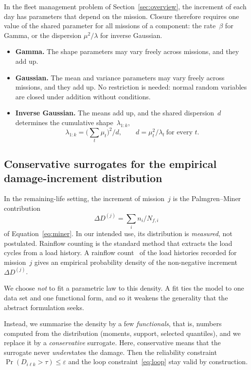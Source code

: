\documentclass[11pt,a4paper]{article}
\theoremstyle{plain}
\theoremstyle{definition}
\theoremstyle{remark}
\begin{document}
In the fleet management problem of Section~\ref{sec:overview}, the increment of each day has parameters that depend on the mission.
Closure therefore requires one value of the shared parameter for all missions of a component: the rate~$\beta$ for Gamma, or the dispersion $\mu^2/\lambda$ for inverse Gaussian.
\begin{itemize}
  \item \textbf{Gamma.} The shape parameters may vary freely across missions, and they add up.
  \item \textbf{Gaussian.} The mean and variance parameters may vary freely across missions, and they add up.
    No restriction is needed: normal random variables are closed under addition without conditions.
  \item \textbf{Inverse Gaussian.} The means add up, and the shared dispersion~$d$ determines the cumulative shape~$\lambda_{1:k}$,
    \begin{equation}
      \lambda_{1:k} = \Big(\sum_t \mu_t\Big)^2\Big/ d,
      \qquad
      d = \mu_t^2/\lambda_t \ \text{for every } t.
    \end{equation}
\end{itemize}

\subsection{Conservative surrogates for the empirical damage-increment distribution}
\label{sec:cons_surrogates}

In the remaining-life setting, the increment of mission~$j$ is the Palmgren--Miner contribution
\begin{equation}
  \Delta D^{(j)} = \sum_i n_i/N_{f,i}
\end{equation}
of Equation~\eqref{eq:miner}.
In our intended use, its distribution is \emph{measured}, not postulated.
Rainflow counting is the standard method that extracts the load cycles from a load history.
A rainflow count~\cite{MunizCalvente2022} of the load histories recorded for mission~$j$ gives an empirical probability density of the non-negative increment $\Delta D^{(j)}$.

We choose \emph{not} to fit a parametric law to this density.
A fit ties the model to one data set and one functional form, and so it weakens the generality that the abstract formulation seeks.

Instead, we summarise the density by a few \emph{functionals}, that is, numbers computed from the distribution (moments, support, selected quantiles), and we replace it by a \emph{conservative} surrogate.
Here, conservative means that the surrogate never \emph{under}states the damage.
Then the reliability constraint $\Pr(D_{i\ell k} > \tau) \le \varepsilon$ and the loop constraint~\eqref{eq:loop} stay valid by construction.
\end{document}
